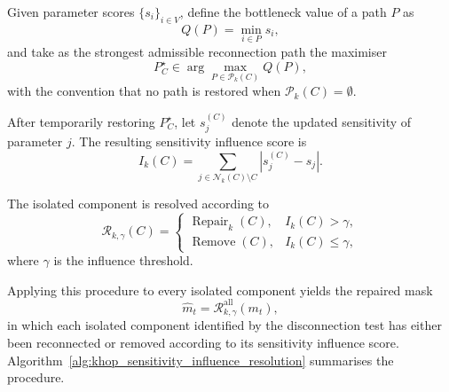 \documentclass{article}
\theoremstyle{definition}
\theoremstyle{remark}
\begin{document}
Given parameter scores $\{s_i\}_{i\in V}$, define the bottleneck value of a
path $P$ as
\[
Q(P)=\min_{i\in P}s_i,
\]
and take as the strongest admissible reconnection path the maximiser
\[
P_C^\star
\in
\arg\max_{P\in\mathcal P_k(C)}
Q(P),
\]
with the convention that no path is restored when
$\mathcal P_k(C)=\emptyset$.

After temporarily restoring $P_C^\star$, let $s_j^{(C)}$ denote the updated sensitivity of parameter $j$. The resulting sensitivity influence score is
\[
I_k(C)
=
\sum_{j\in\mathcal N_k(C)\setminus C}
|s_j^{(C)}-s_j|.
\]

The isolated component is resolved according to
\[
\mathcal R_{k,\gamma}(C)
=
\begin{cases}
\operatorname{Repair}_k(C), & I_k(C)>\gamma,\\
\operatorname{Remove}(C), & I_k(C)\le\gamma,
\end{cases}
\]
where $\gamma$ is the influence threshold.

Applying this procedure to every isolated component yields the repaired mask
\[
\widehat m_t
=
\mathcal R_{k,\gamma}^{\text{all}}(m_t),
\]
in which each isolated component identified by the disconnection test has either been reconnected or removed according to its sensitivity influence score. Algorithm~\ref{alg:khop_sensitivity_influence_resolution} summarises the procedure.
\end{document}
